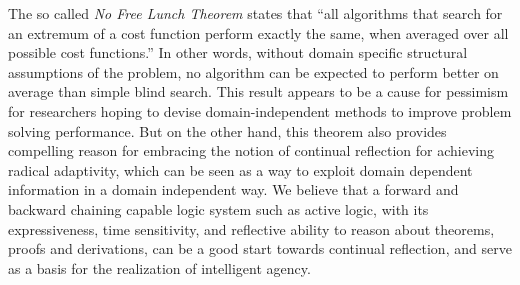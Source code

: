 \documentclass{llncs}
\begin{document}
The so called \emph{No Free Lunch Theorem}
\cite{wolpert/macready1997:no_free} states that {}``all algorithms that
search for an extremum of a cost function perform exactly the same, when
averaged over all possible cost functions.'' In other words, without domain
specific structural assumptions of the problem, no algorithm can be
expected to perform better on average than simple blind search.  This
result appears to be a cause for pessimism for researchers hoping to devise
domain-independent methods to improve problem solving performance.  But on
the other hand, this theorem also provides compelling reason for embracing
the notion of continual reflection for achieving radical adaptivity, which
can be seen as a way to exploit domain dependent information in a domain
independent way.
We believe that a forward and backward chaining capable logic system such
as active logic, with its expressiveness, time sensitivity, and reflective
ability to reason about theorems, proofs and derivations, can be a good
start towards continual reflection, and serve as a basis for the
realization of intelligent agency.



\end{document}
